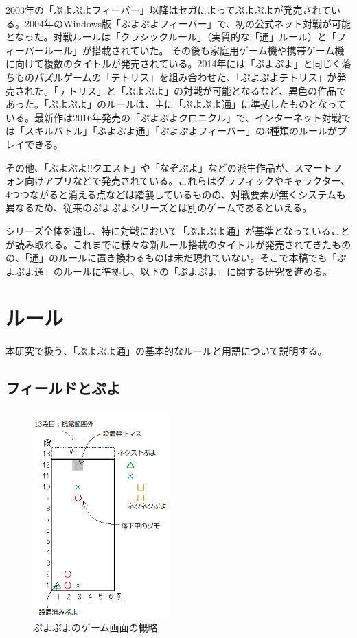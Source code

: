 \documentclass[12pt]{jsarticle}
\begin{document}
2003年の「ぷよぷよフィーバー」以降はセガによってぷよぷよが発売されている。2004年のWindows版「ぷよぷよフィーバー」で、初の公式ネット対戦が可能となった。対戦ルールは「クラシックルール」（実質的な「通」ルール）と「フィーバールール」が搭載されていた。
その後も家庭用ゲーム機や携帯ゲーム機に向けて複数のタイトルが発売されている。2014年には「ぷよぷよ」と同じく落ちものパズルゲームの「テトリス」を組み合わせた、「ぷよぷよテトリス」が発売された。「テトリス」と「ぷよぷよ」の対戦が可能となるなど、異色の作品であった。「ぷよぷよ」のルールは、主に「ぷよぷよ通」に準拠したものとなっている。最新作は2016年発売の「ぷよぷよクロニクル」で、インターネット対戦では「スキルバトル」「ぷよぷよ通」「ぷよぷよフィーバー」の3種類のルールがプレイできる。

その他、「ぷよぷよ!!クエスト」や「なぞぷよ」などの派生作品が、スマートフォン向けアプリなどで発売されている。これらはグラフィックやキャラクター、4つつながると消える点などは踏襲しているものの、対戦要素が無くシステムも異なるため、従来のぷよぷよシリーズとは別のゲームであるといえる。

シリーズ全体を通し、特に対戦において「ぷよぷよ通」が基準となっていることが読み取れる。これまでに様々な新ルール搭載のタイトルが発売されてきたものの、「通」のルールに置き換わるものは未だ現れていない。そこで本稿でも「ぷよぷよ通」のルールに準拠し、以下の「ぷよぷよ」に関する研究を進める。

\section{ルール} \label{rule}
本研究で扱う、「ぷよぷよ通」の基本的なルールと用語について説明する。

\subsection{フィールドとぷよ} \label{field_puyo}
\begin{figure}[hbt]
  \begin{center}
  \includegraphics[height=8cm]{img/field.png}
  \caption{ぷよぷよのゲーム画面の概略} \label{fig:field}
\end{center}
\end{figure}
\end{document}
